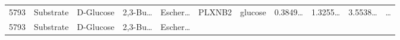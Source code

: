 \documentclass[
]{article}
\begin{document}
\begin{longtable}[]{@{}lllllllllll@{}}
\begin{minipage}[t]{0.03\columnwidth}
5793\strut
\end{minipage} & \begin{minipage}[t]{0.07\columnwidth}\raggedright
Substrate\strut
\end{minipage} & \begin{minipage}[t]{0.07\columnwidth}\raggedright
D-Glucose\strut
\end{minipage} & \begin{minipage}[t]{0.09\columnwidth}\raggedright
2,3-Bu\ldots{}\strut
\end{minipage} & \begin{minipage}[t]{0.07\columnwidth}\raggedright
Escher\ldots{}\strut
\end{minipage} & \begin{minipage}[t]{0.07\columnwidth}\raggedright
PLXNB2\strut
\end{minipage} & \begin{minipage}[t]{0.09\columnwidth}\raggedright
glucose\strut
\end{minipage} & \begin{minipage}[t]{0.07\columnwidth}\raggedright
0.3849\ldots{}\strut
\end{minipage} & \begin{minipage}[t]{0.07\columnwidth}\raggedright
1.3255\ldots{}\strut
\end{minipage} & \begin{minipage}[t]{0.07\columnwidth}\raggedright
3.5538\ldots{}\strut
\end{minipage} & \begin{minipage}[t]{0.03\columnwidth}\raggedright
\ldots{}\strut
\end{minipage}\tabularnewline
\begin{minipage}[t]{0.03\columnwidth}\raggedright
5793\strut
\end{minipage} & \begin{minipage}[t]{0.07\columnwidth}\raggedright
Substrate\strut
\end{minipage} & \begin{minipage}[t]{0.07\columnwidth}\raggedright
D-Glucose\strut
\end{minipage} & \begin{minipage}[t]{0.09\columnwidth}\raggedright
2,3-Bu\ldots{}\strut
\end{minipage} & \begin{minipage}[t]{0.07\columnwidth}\raggedright
Escher\ldots{}\strut
\end{minipage} & \begin{minipage}[t]{0.07\columnwidth}\raggedright

\end{minipage}
\end{longtable}
\end{document}
